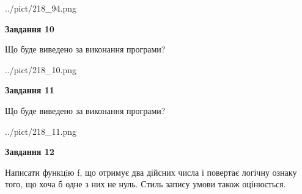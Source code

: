 \documentclass[12pt, ukrainian]{article}
\begin{document}
{\begin {large}
\begin{center}
	{../pict/218_94.png}
\end{center}
\newpage

{\begin {center}\textbf{Завдання 10}\end {center}}

Що буде виведено за виконання програми?\par
\begin{center}
	{../pict/218_10.png}
\end{center}
\newpage

{\begin {center}\textbf{Завдання 11}\end {center}}

Що буде виведено за виконання програми?\par
\begin{center}
	{../pict/218_11.png}
\end{center}
\newpage

{\begin {center}\textbf{Завдання 12}\end {center}}


Написати функцiю f, що отримує два дійсних числа і повертає логічну ознаку того, що хоча б одне з них не нуль. Стиль запису умови також оцінюється.\par
\newpage

\end {large}}
\end{document}
